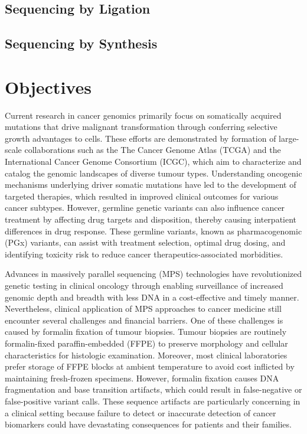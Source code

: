 \subsection{Sequencing by Ligation}

\subsection{Sequencing by Synthesis}


\section{Objectives}
\label{sec:Objectives}

Current research in cancer genomics primarily focus on somatically acquired mutations that drive malignant transformation through conferring selective growth advantages to cells. These efforts are demonstrated by formation of large-scale collaborations such as the The Cancer Genome Atlas (TCGA) and the International Cancer Genome Consortium (ICGC), which aim to characterize and catalog the genomic landscapes of diverse tumour types. Understanding oncogenic mechanisms underlying driver somatic mutations have led to the development of targeted therapies, which resulted in improved clinical outcomes for various cancer subtypes. However, germline genetic variants can also influence cancer treatment by affecting drug targets and disposition, thereby causing interpatient differences in drug response. These germline variants, known as pharmacogenomic (PGx) variants, can assist with treatment selection, optimal drug dosing, and identifying toxicity risk to reduce cancer therapeutics-associated morbidities.

Advances in massively parallel sequencing (MPS) technologies have revolutionized genetic testing in clinical oncology through enabling surveillance of increased genomic depth and breadth with less DNA in a cost-effective and timely manner. Nevertheless, clinical application of MPS approaches to cancer medicine still encounter several challenges and financial barriers. One of these challenges is caused by formalin fixation of tumour biopsies. Tumour biopsies are routinely formalin-fixed paraffin-embedded (FFPE) to preserve morphology and cellular characteristics for histologic examination. Moreover, most clinical laboratories prefer storage of FFPE blocks at ambient temperature to avoid cost inflicted by maintaining fresh-frozen specimens. However, formalin fixation causes DNA fragmentation and base transition artifacts, which could result in false-negative or false-positive variant calls. These sequence artifacts are particularly concerning in a clinical setting because failure to detect or inaccurate detection of cancer biomarkers could have devastating consequences for patients and their families.

